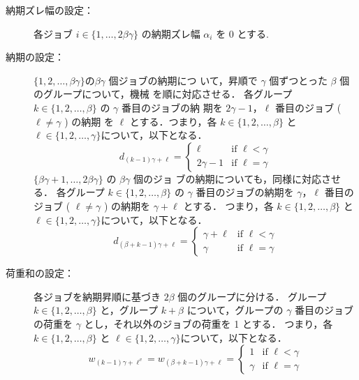 \documentclass[12pt]{optlab-bachelor}
\begin{document}
\begin{description}
  \item[納期ズレ幅の設定：]
  各ジョブ $i \in \{1,\ldots,2\beta \gamma\}$ の納期ズレ幅
  $\alpha_i$ を 0 とする.
  \item[納期の設定：] $\{1,2,\ldots, \beta \gamma\}$$ の $$\beta \gamma$ 個ジョブの納期につ
  いて，昇順で $\gamma$ 個ずつとった $\beta$ 個のグループについて，機械
  を順に対応させる．
  各グループ $k \in \{1,2,\ldots, \beta\}$ の $\gamma$ 番目のジョブの納
  期を $2\gamma - 1$，$\ell$ 番目のジョブ ( $\ell \neq \gamma$ ) の納期
  を $\ell$ とする．つまり，各 $k \in \{1,2,\ldots, \beta\}$ と $\ell \in \{1,2,\ldots,
  \gamma\}$について，以下となる．
  \begin{displaymath}
    d_{(k - 1)\gamma + \ell} = \left\{ \begin{array}{ll} \ell & \text{if } \ell < \gamma \\ 2\gamma - 1 & \text{if } \ell = \gamma \end{array} \right.
  \end{displaymath}
  $\{\beta \gamma + 1,\ldots, 2\beta \gamma\}$ の $\beta \gamma$ 個のジョ
  ブの納期についても，同様に対応させる．
  各グループ $k \in \{1,2,\ldots, \beta\}$ の $\gamma$ 番目のジョブの納期を $\gamma$，$\ell$ 番目のジョブ ( $\ell \neq \gamma$ ) の納期を $\gamma + \ell$ とする．
  つまり，各 $k \in \{1,2,\ldots, \beta\}$ と $\ell \in \{1,2,\ldots,
  \gamma\}$について，以下となる．
  \begin{displaymath}
    d_{(\beta + k - 1)\gamma + \ell} = \left\{ \begin{array}{ll}\gamma +  \ell & \text{if } \ell < \gamma \\ \gamma & \text{if } \ell = \gamma \end{array} \right.
  \end{displaymath}
  \item[荷重和の設定：] 各ジョブを納期昇順に基づき $2\beta$ 個のグループに分ける．
  グループ $k \in \{1,2,\ldots,\beta\}$ と，グループ $k + \beta$ について，グループの $\gamma$ 番目のジョブの荷重を $\gamma$ とし，それ以外のジョブの荷重を 1 とする．
  つまり，各 $k \in \{1,2,\ldots, \beta\}$ と $\ell \in \{1,2,\ldots,
  \gamma\}$について，以下となる．
  \begin{displaymath}
    w_{(k - 1)\gamma + \ell^v} = w_{(\beta + k - 1)\gamma + \ell} = \left\{ \begin{array}{ll} 1 & \text{if } \ell < \gamma \\ \gamma & \text{if } \ell = \gamma \end{array} \right.

\end{displaymath}
\end{description}
\end{document}
